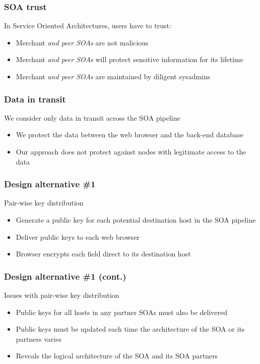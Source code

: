 \documentclass{beamer}
\begin{document}
\begin{frame}
\frametitle{SOA trust}
In Service Oriented Architectures, users have to trust:
\smallskip
\begin{itemize}
\item Merchant \emph{and peer SOAs} are not malicious
\item Merchant \emph{and peer SOAs} will protect sensitive information for its
lifetime
\item Merchant \emph{and peer SOAs} are maintained by diligent sysadmins
\end{itemize}
\end{frame}

\begin{frame}
\frametitle{Data in transit}
We consider only data in transit across the SOA pipeline
\smallskip
\begin{itemize}
\item We protect the data between the web browser and the back-end database
\item Our approach does not protect against nodes with legitimate access to the
data
\end{itemize}
\end{frame}

\begin{frame}
\frametitle{Design alternative \#1}
Pair-wise key distribution
\smallskip
\begin{itemize}
\item Generate a public key for each potential destination host in the SOA
pipeline
\item Deliver public keys to each web browser
\item Browser encrypts each field direct to its destination host 
\end{itemize}
\end{frame}

\begin{frame}
\frametitle{Design alternative \#1 (cont.)}
Issues with pair-wise key distribution
\smallskip
\begin{itemize}
\item Public keys for all hosts in any partner SOAs must also be delivered
\item Public keys must be updated each time the architecture of the SOA or
its partners varies
\item Reveals the logical architecture of the SOA and its SOA partners
\end{itemize}
\end{frame}
\end{document}
